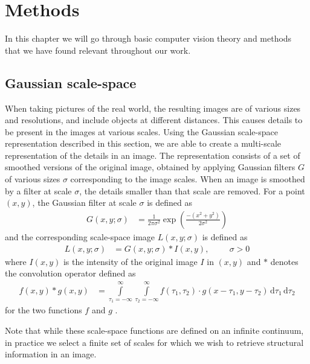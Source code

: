 \documentclass[thesis.tex]{subfiles}
\begin{document}
\chapter{Methods}
In this chapter we will go through basic computer vision theory and methods that we have found relevant throughout our work.

\section{Gaussian scale-space}
\label{sec:GaussianScaleSpace}
%
When taking pictures of the real world, the resulting images are of various sizes and resolutions, and include objects at different distances. This causes details to be present in the images at various scales. Using the Gaussian scale-space representation \cite{griffin1997scale,ginneken2000applications} described in this section, we are able to create a multi-scale representation of the details in an image. The representation consists of a set of smoothed versions of the original image, obtained by applying Gaussian filters $G$ of various sizes $\sigma$ corresponding to the image scales. When an image is smoothed by a filter at scale $\sigma$, the details smaller than that scale are removed. For a point $(x,y)$, the Gaussian filter at scale $\sigma$ is defined as
%
\begin{align}
	G(x,y;\sigma) &= \frac{1}{2\pi \sigma^2} \exp \left(\frac{-(x^2+y^2)}{2\sigma^2} \right)
\end{align}
%
and the corresponding scale-space image $L(x,y;\sigma)$ is defined as
%
\begin{align}
	L(x,y;\sigma) &= G(x,y;\sigma) \ast I(x,y),\hspace{1cm}\sigma > 0
\end{align}
%
where $I(x,y)$ is the intensity of the original image $I$ in $(x,y)$ and $\ast$ denotes the convolution operator defined as
\begin{align*}
	f(x,y) \ast g(x,y) &= \int\limits_{\tau_1 = -\infty}^\infty \int\limits_{\tau_2 = -\infty}^\infty f(\tau_1,\tau_2) \cdot g(x-\tau_1,y-\tau_2)\,\text{d}\tau_1\,\text{d}\tau_2
\end{align*}
for the two functions $f$ and $g$ \cite[p.~345]{gonzalez:2008:digital}.

Note that while these scale-space functions are defined on an infinite continuum, in practice we select a finite set of scales for which we wish to retrieve structural information in an image.
\end{document}
